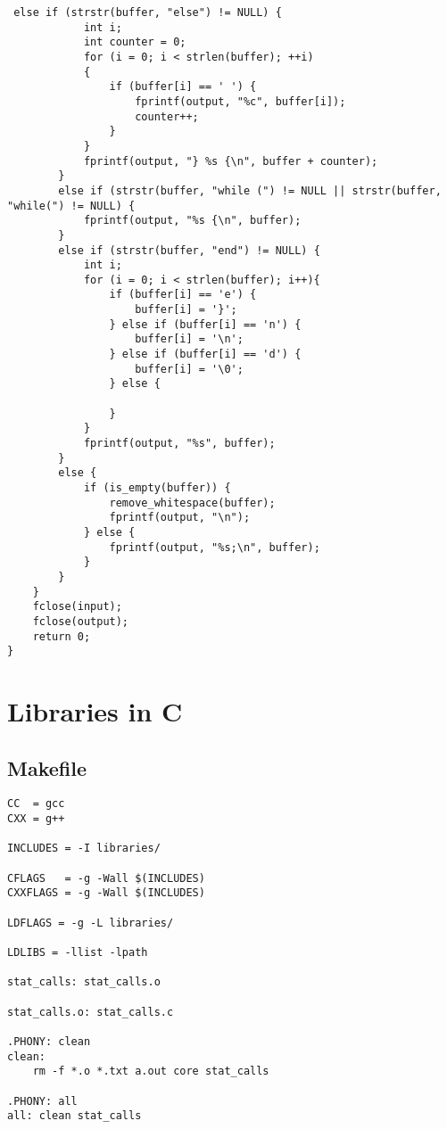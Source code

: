 \documentclass[11pt]{article}
\begin{document}
\begin{listing}[H]
  \begin{verbatim}
 else if (strstr(buffer, "else") != NULL) {
            int i;
            int counter = 0;
            for (i = 0; i < strlen(buffer); ++i)
            {
                if (buffer[i] == ' ') {
                    fprintf(output, "%c", buffer[i]);
                    counter++;
                }
            }
            fprintf(output, "} %s {\n", buffer + counter);
        }
        else if (strstr(buffer, "while (") != NULL || strstr(buffer, "while(") != NULL) {
            fprintf(output, "%s {\n", buffer);
        }
        else if (strstr(buffer, "end") != NULL) {
            int i;
            for (i = 0; i < strlen(buffer); i++){
                if (buffer[i] == 'e') {
                    buffer[i] = '}';
                } else if (buffer[i] == 'n') {
                    buffer[i] = '\n';
                } else if (buffer[i] == 'd') {
                    buffer[i] = '\0';
                } else {

                }
            }
            fprintf(output, "%s", buffer);
        }
        else {
            if (is_empty(buffer)) {
                remove_whitespace(buffer);
                fprintf(output, "\n");
            } else {
                fprintf(output, "%s;\n", buffer);
            }
        }
    }
    fclose(input);
    fclose(output);
    return 0;
}
  \end{verbatim}
\end{listing}

\section{Libraries in C}

\subsection{Makefile}

\begin{listing}[H]
  \begin{verbatim}
CC  = gcc
CXX = g++

INCLUDES = -I libraries/

CFLAGS   = -g -Wall $(INCLUDES)
CXXFLAGS = -g -Wall $(INCLUDES)

LDFLAGS = -g -L libraries/

LDLIBS = -llist -lpath

stat_calls: stat_calls.o

stat_calls.o: stat_calls.c

.PHONY: clean
clean:
    rm -f *.o *.txt a.out core stat_calls

.PHONY: all
all: clean stat_calls

  \end{verbatim}
\end{listing}
\end{document}
